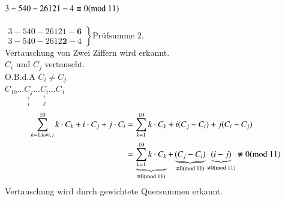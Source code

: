 \\
$3-540-26121-4 \equiv 0(\text{mod }11)$\\ \\
$\left.
\begin{matrix}
	3-540-26121-\mathbf{6} \\
	3-540-2612\mathbf{2}-4
\end{matrix}
\right\} \text{Pr\"ufsumme 2.}
$\\
Vertauschung von Zwei Ziffern wird erkannt.\\
$C_i$ und $C_j$ vertauscht.\\
O.B.d.A $C_i \neq C_j$\\
$C_{10} \ldots \underset{\stackrel{\uparrow}{i}}{C_j} \ldots \underset{\stackrel{\uparrow}{j}}{C_i} \ldots C_1$\\
\begin{align*}
	\sum^{10}_{k=1, k\neq i,j} k \cdot C_k + i \cdot 	C_j + j \cdot C_i
	&= \sum^{10}_{k=1} k \cdot C_k + i(C_j-C_i)+j(C_i-C_j)\\
	&= 
	\underbrace{\sum^{10}_{k=1} k \cdot C_k}_{\equiv 0 (\md{11})}
	 + 
	 \underbrace{(C_j-C_i)}_{\nequiv 0 (\md{11})}
	 \underbrace{(i-j)}_{\nequiv 0 (\md{11})}
	 \nequiv 0 (\md{11})
\end{align*}
Vertauschung wird durch gewichtete Quersummen erkannt.


